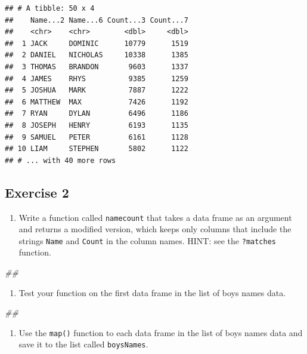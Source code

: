 \documentclass[]{book}
\newenvironment{Shaded}{\begin{snugshade}}{\end{snugshade}}
\newcommand{\CommentTok}[1]{\textcolor[rgb]{0.56,0.35,0.01}{\textit{#1}}}
\providecommand{\tightlist}{%
  \setlength{\itemsep}{0pt}\setlength{\parskip}{0pt}}
\begin{document}
\begin{verbatim}
## # A tibble: 50 x 4
##    Name...2 Name...6 Count...3 Count...7
##    <chr>    <chr>        <dbl>     <dbl>
##  1 JACK     DOMINIC      10779      1519
##  2 DANIEL   NICHOLAS     10338      1385
##  3 THOMAS   BRANDON       9603      1337
##  4 JAMES    RHYS          9385      1259
##  5 JOSHUA   MARK          7887      1222
##  6 MATTHEW  MAX           7426      1192
##  7 RYAN     DYLAN         6496      1186
##  8 JOSEPH   HENRY         6193      1135
##  9 SAMUEL   PETER         6161      1128
## 10 LIAM     STEPHEN       5802      1122
## # ... with 40 more rows
\end{verbatim}

\hypertarget{exercise-2-2}{%
\subsection{Exercise 2}\label{exercise-2-2}}

\begin{enumerate}
\def\labelenumi{\arabic{enumi}.}
\tightlist
\item
  Write a function called \texttt{namecount} that takes a data frame as an
  argument and returns a modified version, which keeps only columns that
  include the strings \texttt{Name} and \texttt{Count} in the column names.
  HINT: see the \texttt{?matches} function.
\end{enumerate}

\begin{Shaded}
\begin{Highlighting}[]
\CommentTok{## }
\end{Highlighting}
\end{Shaded}

\begin{enumerate}
\def\labelenumi{\arabic{enumi}.}
\setcounter{enumi}{1}
\tightlist
\item
  Test your function on the first data frame in the list of boys
  names data.
\end{enumerate}

\begin{Shaded}
\begin{Highlighting}[]
\CommentTok{## }
\end{Highlighting}
\end{Shaded}

\begin{enumerate}
\def\labelenumi{\arabic{enumi}.}
\setcounter{enumi}{2}
\tightlist
\item
  Use the \texttt{map()} function to each data frame in the list of boys
  names data and save it to the list called \texttt{boysNames}.
\end{enumerate}
\end{document}
